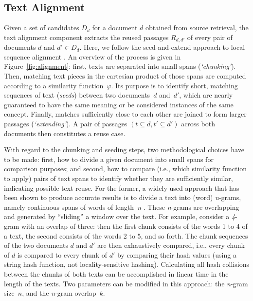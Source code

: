\subsection*{Text Alignment}\label{sub:alignment}

Given a set of candidates $D_d$ for a document $d$ obtained from source retrieval, the text alignment component extracts the reused passages $R_{d,d'}$ of every pair of documents $d$ and $d'\in D_d$. Here, we follow the seed-and-extend approach to local sequence alignment \cite{potthast:2012b}. An overview of the process is given in Figure~\ref{fig:alignment}: first, texts are separated into small spans (\emph{`chunking'}). Then, matching text pieces in the cartesian product of those spans are computed according to a similarity function~$\varphi$. Its purpose is to identify short, matching sequences of text (\textit{seeds}) between two documents~$d$ and~$d'$, which are nearly guaranteed to have the same meaning or be considered instances of the same concept. Finally, matches sufficiently close to each other are joined to form larger passages (\emph{`extending'}). A pair of passages $(t \subseteq d, t' \subseteq d')$ across both documents then constitutes a reuse case.

With regard to the chunking and seeding steps, two methodological choices have to be made: first, how to divide a given document into small spans for comparison purposes; and second, how to compare (i.e., which similarity function to apply) pairs of text spans to identify whether they are sufficiently similar, indicating possible text reuse. For the former, a widely used approach that has been shown to produce accurate results is to divide a text into (word) \emph{n}-grams, namely continuous spans of words of length~\emph{n} \cite{stamatatos:2011,citron:2015}. These \emph{n}-grams are overlapping and generated by ``sliding'' a window over the text. For example, consider a \emph{4}-gram with an overlap of three: then the first chunk consists of the words 1 to 4 of a text, the second consists of the words 2 to 5, and so forth. The chunk sequences of the two documents $d$ and $d'$ are then exhaustively compared, i.e., every chunk of $d$ is compared to every chunk of $d'$ by comparing their hash values (using a string hash function, not locality-sensitive hashing). Calculating all hash collisions between the chunks of both texts can be accomplished in linear time in the length of the texts. Two parameters can be modified in this approach: the \emph{n}-gram size~$n$, and the \emph{n}-gram overlap~$k$.

